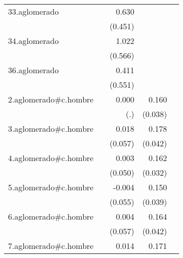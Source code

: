 {\begin{longtable}{l*{4}{D{.}{.}{-1}}}
\addlinespace
33.aglomerado&                     &       0.630         &                     &                     \\
            &                     &     (0.451)         &                     &                     \\
\addlinespace
34.aglomerado&                     &       1.022         &                     &                     \\
            &                     &     (0.566)         &                     &                     \\
\addlinespace
36.aglomerado&                     &       0.411         &                     &                     \\
            &                     &     (0.551)         &                     &                     \\
\addlinespace
2.aglomerado#c.hombre&                     &       0.000         &       0.160\sym{***}&                     \\
            &                     &         (.)         &     (0.038)         &                     \\
\addlinespace
3.aglomerado#c.hombre&                     &       0.018         &       0.178\sym{***}&                     \\
            &                     &     (0.057)         &     (0.042)         &                     \\
\addlinespace
4.aglomerado#c.hombre&                     &       0.003         &       0.162\sym{***}&                     \\
            &                     &     (0.050)         &     (0.032)         &                     \\
\addlinespace
5.aglomerado#c.hombre&                     &      -0.004         &       0.150\sym{***}&                     \\
            &                     &     (0.055)         &     (0.039)         &                     \\
\addlinespace
6.aglomerado#c.hombre&                     &       0.004         &       0.164\sym{***}&                     \\
            &                     &     (0.057)         &     (0.042)         &                     \\
\addlinespace
7.aglomerado#c.hombre&                     &       0.014         &       0.171\sym{***}&                     \\

\end{longtable}}

